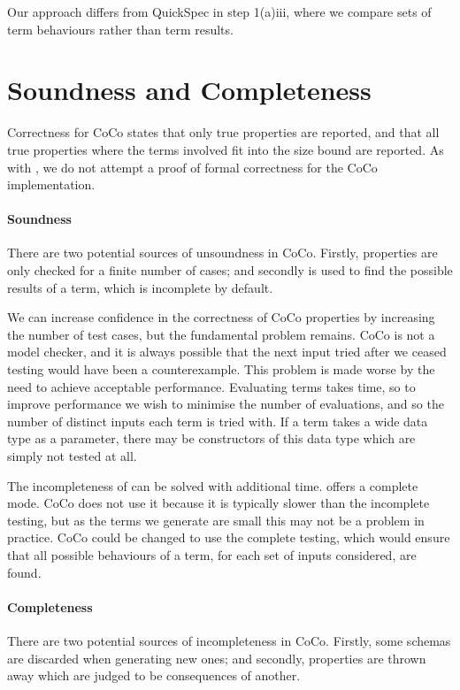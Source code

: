 Our approach differs from QuickSpec \parencite{claessen2010,smallbone2017}
in step 1(a)iii, where we compare sets of term behaviours rather than
term results.

\section{Soundness and Completeness}
\label{sec:coco-correctness}

Correctness for CoCo states that only true properties are reported,
and that all true properties where the terms involved fit into the
size bound are reported.  As with \dejafu{}, we do not attempt a proof
of formal correctness for the CoCo implementation.

\paragraph{Soundness}
There are two potential sources of unsoundness in CoCo.  Firstly,
properties are only checked for a finite number of cases; and secondly
\dejafu{} is used to find the possible results of a term, which is
incomplete by default.

We can increase confidence in the correctness of CoCo properties by
increasing the number of test cases, but the fundamental problem
remains.  CoCo is not a model checker, and it is always possible that
the next input tried after we ceased testing would have been a
counterexample.  This problem is made worse by the need to achieve
acceptable performance.  Evaluating terms takes time, so to improve
performance we wish to minimise the number of evaluations, and so the
number of distinct inputs each term is tried with.  If a term takes a
wide data type as a parameter, there may be constructors of this data
type which are simply not tested at all.

The incompleteness of \dejafu{} can be solved with additional time.
\dejafu{} offers a complete mode.  CoCo does not use it because it is
typically slower than the incomplete testing, but as the terms we
generate are small this may not be a problem in practice.  CoCo could
be changed to use the complete testing, which would ensure that all
possible behaviours of a term, for each set of inputs considered, are
found.

\paragraph{Completeness}
There are two potential sources of incompleteness in CoCo.  Firstly,
some schemas are discarded when generating new ones; and secondly,
properties are thrown away which are judged to be consequences of
another.

